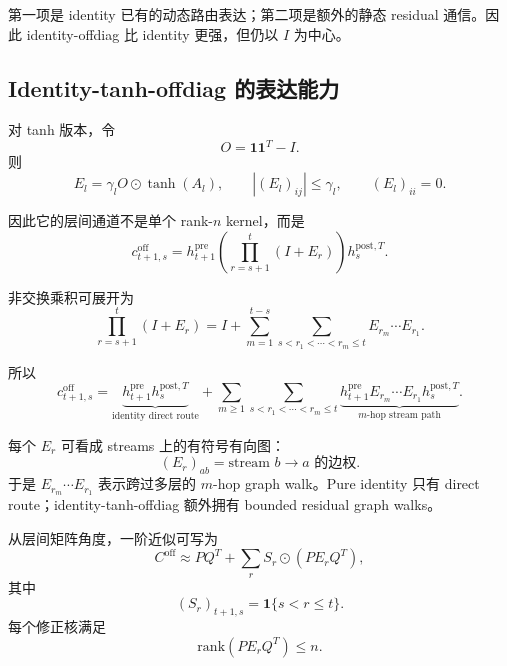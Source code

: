 \documentclass[UTF8,11pt]{ctexart}
\newcommand{\one}{\mathbf{1}}
\begin{document}
第一项是 identity 已有的动态路由表达；第二项是额外的静态 residual 通信。因此 identity-offdiag 比 identity 更强，但仍以 $I$ 为中心。

\subsection*{Identity-tanh-offdiag 的表达能力}

对 tanh 版本，令
\begin{equation}
  O=
  \one\one^T-I.
\end{equation}
则
\begin{equation}
  E_l=
  \gamma_l O\odot\tanh(A_l),
  \qquad
  |(E_l)_{ij}|
  \le
  \gamma_l,
  \qquad
  (E_l)_{ii}=0.
\end{equation}

因此它的层间通道不是单个 rank-$n$ kernel，而是
\begin{equation}
  c_{t+1,s}^{\mathrm{off}}
  =
  h_{t+1}^{\mathrm{pre}}
  \left(
  \prod_{r=s+1}^{t}(I+E_r)
  \right)
  h_s^{\mathrm{post},T}.
\end{equation}

非交换乘积可展开为
\begin{equation}
  \prod_{r=s+1}^{t}(I+E_r)
  =
  I+
  \sum_{m=1}^{t-s}
  \sum_{s<r_1<\cdots<r_m\le t}
  E_{r_m}\cdots E_{r_1}.
\end{equation}

所以
\begin{equation}
  c_{t+1,s}^{\mathrm{off}}
  =
  \underbrace{
  h_{t+1}^{\mathrm{pre}}h_s^{\mathrm{post},T}
  }_{\text{identity direct route}}
  +
  \sum_{m\ge1}
  \sum_{s<r_1<\cdots<r_m\le t}
  \underbrace{
  h_{t+1}^{\mathrm{pre}}E_{r_m}\cdots E_{r_1}h_s^{\mathrm{post},T}
  }_{\text{$m$-hop stream path}}.
\end{equation}

每个 $E_r$ 可看成 streams 上的有符号有向图：
\begin{equation}
  (E_r)_{ab}
  =
  \text{stream } b\to a \text{ 的边权}.
\end{equation}
于是 $E_{r_m}\cdots E_{r_1}$ 表示跨过多层的 $m$-hop graph walk。Pure identity 只有 direct route；identity-tanh-offdiag 额外拥有 bounded residual graph walks。

从层间矩阵角度，一阶近似可写为
\begin{equation}
  C^{\mathrm{off}}
  \approx
  PQ^T+
  \sum_r S_r\odot(PE_rQ^T),
\end{equation}
其中
\begin{equation}
  (S_r)_{t+1,s}
  =
  \mathbf{1}\{s<r\le t\}.
\end{equation}
每个修正核满足
\begin{equation}
  \mathrm{rank}(PE_rQ^T)
  \le
  n.
\end{equation}
\end{document}
